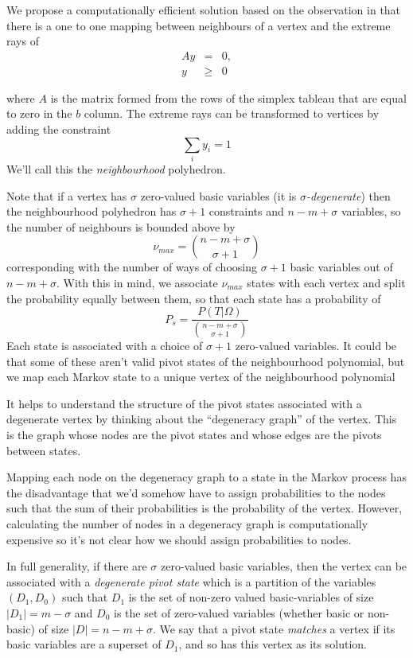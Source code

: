 \documentclass{article}
\begin{document}
We propose a computationally efficient solution based on the observation in \cite{yamada1994enumerating} that there is a one to one mapping between neighbours of a vertex and the extreme rays of
\begin{eqnarray*}
Ay & = & 0, \\
  y & \ge & 0
\end{eqnarray*}

where $A$ is the matrix formed from the rows of the simplex tableau that are equal to zero in the $b$ column. The extreme rays can be transformed to vertices by adding the constraint
\[
\sum_i y_i = 1
\]
 We'll call this the \textit{neighbourhood} polyhedron.

Note that if a vertex has $\sigma$ zero-valued basic variables (it is $\sigma$\textit{-degenerate}) then the neighbourhood polyhedron has $\sigma + 1$ constraints and $n-m+\sigma$ variables, so the number of neighbours is bounded above by
\[
\nu_{max} = \left. n-m+\sigma \choose \sigma + 1 \right.
\]
corresponding with the number of ways of choosing $\sigma + 1$ basic variables out of $n-m+\sigma$. With this in mind, we associate $\nu_{max}$ states with each vertex and split the probability equally between them, so that each state has a probability of
\[
P_s = \frac{P(T|\Omega)}{\left. n-m+\sigma \choose \sigma + 1 \right.}
\]
Each state is associated with a choice of $\sigma+1$ zero-valued variables. It could be that some of these aren't valid pivot states of the neighbourhood polynomial, but we map each Markov state to a unique vertex of the neighbourhood polynomial 

It helps to understand the structure of the pivot states associated with a degenerate vertex by thinking about the  ``degeneracy graph''\cite{zornig93degeneracy} of the vertex. This is the graph whose nodes are the pivot states and whose edges are the pivots between states.

Mapping each node on the degeneracy graph to a state in the Markov process has the disadvantage that we'd somehow have to assign probabilities to the nodes such that the sum of their probabilities is the probability of the vertex. However, calculating the number of nodes in a degeneracy graph is computationally expensive\cite{zornig93degeneracy} so it's not clear how we should assign probabilities to nodes.


In full generality, if there are $\sigma$ zero-valued basic variables, then the vertex can be associated with a \textit{degenerate pivot state} which is a partition of the variables $(D_1,D_0)$ such that $D_1$ is the set of non-zero valued basic-variables of size $|D_1| = m-\sigma$ and $D_0$ is the set of zero-valued variables (whether basic or non-basic) of size $|D| = n-m+\sigma$. We say that a pivot state \textit{matches} a vertex if its basic variables are a superset of $D_1$, and so has this vertex as its solution. 
\end{document}
